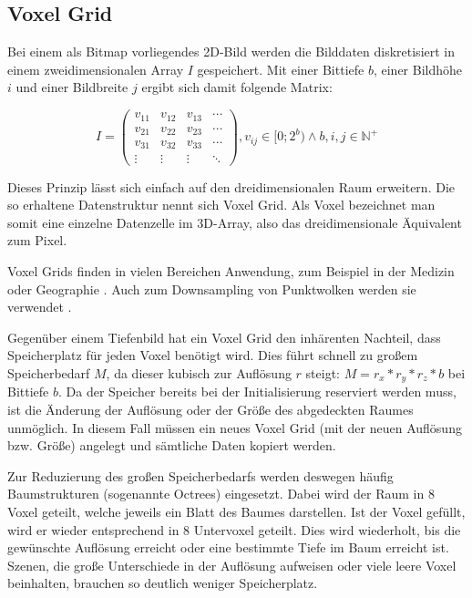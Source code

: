 \subsection{Voxel Grid}
\label{subsec:voxel-grid}

Bei einem als Bitmap vorliegendes 2D-Bild werden die Bilddaten diskretisiert in einem zweidimensionalen Array $I$ gespeichert.
Mit einer Bittiefe $b$, einer Bildhöhe $i$ und einer Bildbreite $j$ ergibt sich damit folgende Matrix:

$$I = \begin{pmatrix}
v_{11} & v_{12} & v_{13} & \cdots\\
v_{21} & v_{22} & v_{23} & \cdots\\
v_{31} & v_{32} & v_{33} & \cdots\\
\vdots & \vdots & \vdots & \ddots
\end{pmatrix}, v_{ij} \in [0; 2^b) \wedge b, i, j \in \mathbb{N}^+$$

Dieses Prinzip lässt sich einfach auf den dreidimensionalen Raum erweitern.
Die so erhaltene Datenstruktur nennt sich Voxel Grid.
Als Voxel bezeichnet man somit eine einzelne Datenzelle im 3D-Array, also das dreidimensionale Äquivalent zum Pixel.

Voxel Grids finden in vielen Bereichen Anwendung, zum Beispiel in der Medizin \cite{van2008hippocampus, klein2009elastix, mohanty2012secure, roche1999towards} oder Geographie \cite{chmielewski2017estimating}.
Auch zum Downsampling von Punktwolken werden sie verwendet \cite{pclVoxelGrid}. %

Gegenüber einem Tiefenbild hat ein Voxel Grid den inhärenten Nachteil, dass Speicherplatz für jeden Voxel benötigt wird.
Dies führt schnell zu großem Speicherbedarf $M$, da dieser kubisch zur Auflösung $r$ steigt: $M = r_x * r_y * r_z * b$ bei Bittiefe $b$.
Da der Speicher bereits bei der Initialisierung reserviert werden muss, ist die Änderung der Auflösung oder der Größe des abgedeckten Raumes unmöglich.
In diesem Fall müssen ein neues Voxel Grid (mit der neuen Auflösung bzw. Größe) angelegt und sämtliche Daten kopiert werden.

Zur Reduzierung des großen Speicherbedarfs werden deswegen häufig Baumstrukturen (sogenannte Octrees) eingesetzt.
Dabei wird der Raum in 8 Voxel geteilt, welche jeweils ein Blatt des Baumes darstellen.
Ist der Voxel gefüllt, wird er wieder entsprechend in 8 Untervoxel geteilt.
Dies wird wiederholt, bis die gewünschte Auflösung erreicht oder eine bestimmte Tiefe im Baum erreicht ist.
Szenen, die große Unterschiede in der Auflösung aufweisen oder viele leere Voxel beinhalten, brauchen so deutlich weniger Speicherplatz.

